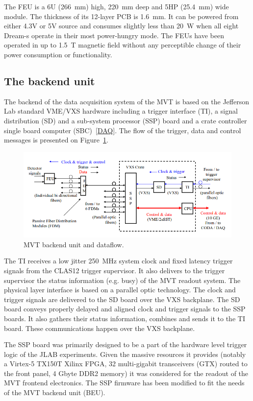The FEU is a 6U (266~mm) high, 220~mm deep and 5HP (25.4~mm) wide module. The thickness of its 12-layer PCB is 1.6~mm. It can be powered from either 4.3V or 5V source and consumes slightly less than 20~W when all eight Dream-s operate in their most power-hungry mode. The FEUs have been operated in up to 1.5~T magnetic field without any perceptible change of their power consumption or functionality.

\subsection{The backend unit}
The backend of the data acquisition system of the MVT is based on the Jefferson Lab standard VME/VXS hardware including a trigger interface (TI), a signal distribution (SD) and a sub-system processor (SSP) board and a crate controller single board computer (SBC)~\ref{DAQ}. The flow of the trigger, data and control messages is presented on Figure~\ref{fig:mm-e_4}. 

\begin{figure}[htb]
 \includegraphics[width=1.0\columnwidth,keepaspectratio]{images/electronics_fig4.png}
 \caption{MVT backend unit and dataflow.}
 \label{fig:mm-e_4}
\end{figure}

The TI receives a low jitter 250~MHz system clock and fixed latency trigger signals from the CLAS12 trigger supervisor. It also delivers to the trigger supervisor the status information (e.g. busy) of the MVT readout system. The physical layer interface is based on a parallel optic technology. The clock and trigger signals are delivered to the SD board over the VXS backplane. The SD board conveys properly delayed and aligned clock and trigger signals to the SSP boards. It also gathers their status information, combines and sends it to the TI board. These communications happen over the VXS backplane.

The SSP board was primarily designed to be a part of the hardware level trigger logic of the JLAB experiments. Given the massive resources it provides (notably a Virtex-5 TX150T Xilinx FPGA, 32 multi-gigabit transceivers (GTX) routed to the front panel, 4 Gbyte DDR2 memory) it was considered for the readout of the MVT frontend electronics. The SSP firmware has been modified to fit the needs of the MVT backend unit (BEU).

